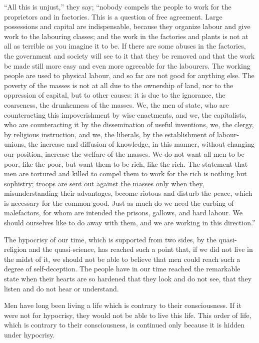 \documentclass{book}
\begin{document}
“All this is unjust,” they say; “nobody compels the people to work for the proprietors and in factories. This is a question of free agreement. Large possessions and capital are indispensable, because they organize labour and give work to the labouring classes; and the work in the factories and plants is not at all as terrible as you imagine it to be. If there are some abuses in the factories, the government and society will see to it that they be removed and that the work be made still more easy and even more agreeable for the labourers. The working people are used to physical labour, and so far are not good for anything else. The poverty of the masses is not at all due to the ownership of land, nor to the oppression of capital, but to other causes: it is due to the ignorance, the coarseness, the drunkenness of the masses. We, the men of state, who are counteracting this impoverishment by wise enactments, and we, the capitalists, who are counteracting it by the dissemination of useful inventions, we, the clergy, by religious instruction, and we, the liberals, by the establishment of labour-unions, the increase and diffusion of knowledge, in this manner, without changing our position, increase the welfare of the masses. We do not want all men to be poor, like the poor, but want them to be rich, like the rich. The statement that men are tortured and killed to compel them to work for the rich is nothing but sophistry; troops are sent out against the masses only when they, misunderstanding their advantages, become riotous and disturb the peace, which is necessary for the common good. Just as much do we need the curbing of malefactors, for whom are intended the prisons, gallows, and hard labour. We should ourselves like to do away with them, and we are working in this direction.”

The hypocrisy of our time, which is supported from two sides, by the quasi-religion and the quasi-science, has reached such a point that, if we did not live in the midst of it, we should not be able to believe that men could reach such a degree of self-deception. The people have in our time reached the remarkable state when their hearts are so hardened that they look and do not see, that they listen and do not hear or understand.

Men have long been living a life which is contrary to their consciousness. If it were not for hypocrisy, they would not be able to live this life. This order of life, which is contrary to their consciousness, is continued only because it is hidden under hypocrisy.
\end{document}
